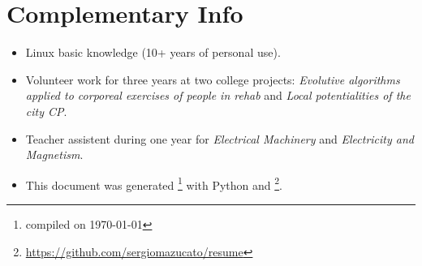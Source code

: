\documentclass[]{friggeri-cv}
\begin{document}
%

\section{Complementary Info}

\begin{itemize}
	\item Linux basic knowledge (10+ years of personal use).
	\item Volunteer work for three years at two college projects: \textit{ Evolutive algorithms applied to corporeal exercises of people in rehab} and \textit{Local potentialities of the city CP}.
	\item Teacher assistent during one year for \textit{Electrical Machinery} and \textit{Electricity and Magnetism}.
	\item This document was generated \footnote{compiled on \today} with Python and \myfont{\LaTeX} \footnote{\url{https://github.com/sergiomazucato/resume}}.
\end{itemize}

\end{document}
